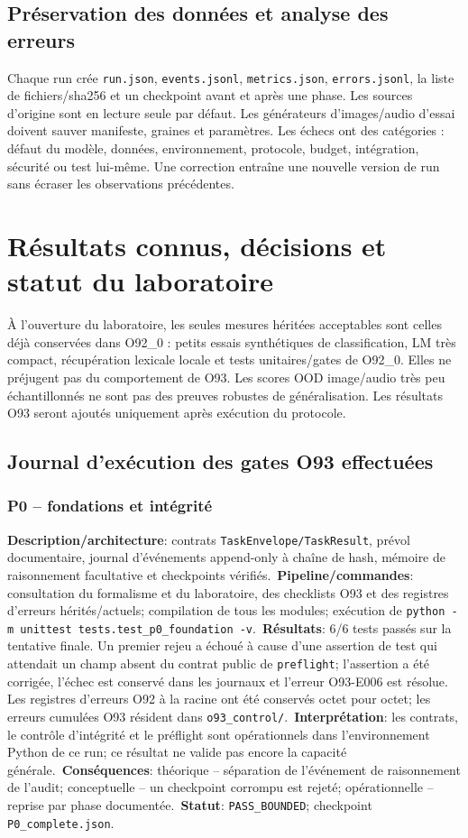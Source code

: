 \documentclass[11pt,a4paper,oneside]{report}
\begin{document}
\section{Préservation des données et analyse des erreurs}
Chaque run crée \texttt{run.json}, \texttt{events.jsonl}, \texttt{metrics.json}, \texttt{errors.jsonl}, la liste de fichiers/sha256 et un checkpoint avant et après une phase. Les sources d'origine sont en lecture seule par défaut. Les générateurs d'images/audio d'essai doivent sauver manifeste, graines et paramètres. Les échecs ont des catégories : défaut du modèle, données, environnement, protocole, budget, intégration, sécurité ou test lui-même. Une correction entraîne une nouvelle version de run sans écraser les observations précédentes.

\chapter{Résultats connus, décisions et statut du laboratoire}
À l'ouverture du laboratoire, les seules mesures héritées acceptables sont celles déjà conservées dans O92\_0 : petits essais synthétiques de classification, LM très compact, récupération lexicale locale et tests unitaires/gates de O92\_0. Elles ne préjugent pas du comportement de O93. Les scores OOD image/audio très peu échantillonnés ne sont pas des preuves robustes de généralisation. Les résultats O93 seront ajoutés uniquement après exécution du protocole.

\section{Journal d'exécution des gates O93 effectuées}
\subsection{P0 -- fondations et intégrité}
\textbf{Description/architecture}: contrats \texttt{TaskEnvelope/TaskResult}, prévol documentaire, journal d'événements append-only à chaîne de hash, mémoire de raisonnement facultative et checkpoints vérifiés.\
\textbf{Pipeline/commandes}: consultation du formalisme et du laboratoire, des checklists O93 et des registres d'erreurs hérités/actuels; compilation de tous les modules; exécution de \texttt{python -m unittest tests.test\_p0\_foundation -v}.\
\textbf{Résultats}: 6/6 tests passés sur la tentative finale. Un premier rejeu a échoué à cause d'une assertion de test qui attendait un champ absent du contrat public de \texttt{preflight}; l'assertion a été corrigée, l'échec est conservé dans les journaux et l'erreur O93-E006 est résolue. Les registres d'erreurs O92 à la racine ont été conservés octet pour octet; les erreurs cumulées O93 résident dans \texttt{o93\_control/}.\
\textbf{Interprétation}: les contrats, le contrôle d'intégrité et le préflight sont opérationnels dans l'environnement Python de ce run; ce résultat ne valide pas encore la capacité générale.\
\textbf{Conséquences}: théorique -- séparation de l'événement de raisonnement de l'audit; conceptuelle -- un checkpoint corrompu est rejeté; opérationnelle -- reprise par phase documentée.\
\textbf{Statut}: \texttt{PASS\_BOUNDED}; checkpoint \texttt{P0\_complete.json}.
\end{document}
